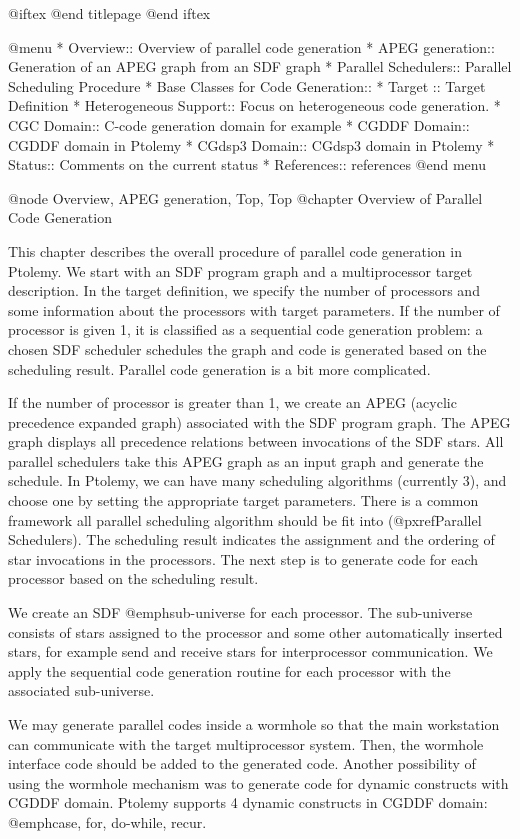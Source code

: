 @iftex
@end titlepage
@end iftex

@menu
* Overview::              	Overview of parallel code generation
* APEG generation::		Generation of an APEG graph from an SDF graph
* Parallel Schedulers::         Parallel Scheduling Procedure
* Base Classes for Code Generation:: 
* Target ::          		Target Definition
* Heterogeneous Support::	Focus on heterogeneous code generation.
* CGC Domain::			C-code generation domain for example
* CGDDF Domain::		CGDDF domain in Ptolemy
* CGdsp3 Domain::		CGdsp3 domain in Ptolemy
* Status::			Comments on the current status
* References::			references
@end menu

@node Overview, APEG generation, Top, Top
@chapter Overview of Parallel Code Generation

This chapter describes the overall procedure of parallel code generation
in Ptolemy. We start with an SDF program graph and a multiprocessor
target description. In the target definition, we specify the number of
processors and some information about the processors with target parameters.
If the number of processor is given 1, it is classified as a sequential
code generation problem: a chosen
SDF scheduler schedules the graph and code is generated based on the
scheduling result. Parallel code generation is a bit more complicated.

If the number of processor is greater than 1, we create an APEG (acyclic
precedence expanded graph) associated with the SDF program graph. The APEG
graph displays all precedence relations between invocations of the SDF
stars. All parallel schedulers take this APEG graph as an input graph
and generate the schedule. In Ptolemy, we can have many scheduling
algorithms (currently 3), and choose one by setting the appropriate
target parameters. There is a common framework all parallel scheduling
algorithm should be fit into (@pxref{Parallel Schedulers}). The scheduling
result indicates the assignment and the ordering of star invocations
in the processors. The next step is to generate code for each processor
based on the scheduling result.

We create an SDF @emph{sub-universe} for each processor. The sub-universe
consists of stars assigned to the processor and some other automatically
inserted stars, for example send and receive stars for interprocessor
communication. We apply the sequential code generation routine for
each processor with the associated sub-universe.

We may generate parallel codes inside a wormhole so that the main
workstation can communicate with the target multiprocessor system. 
Then, the wormhole interface code should be added to the generated code.
Another possibility of using the wormhole mechanism was to generate code
for dynamic constructs with CGDDF domain. Ptolemy supports 4 dynamic 
constructs in CGDDF domain: @emph{case, for, do-while, recur}.

